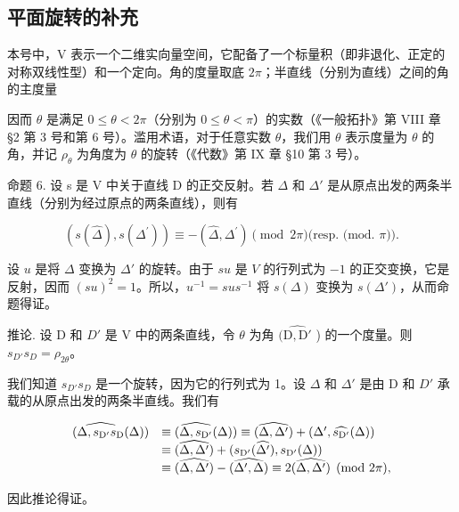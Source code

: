 \subsection{平面旋转的补充}

本号中，V 表示一个二维实向量空间，它配备了一个标量积（即非退化、正定的对称双线性型）和一个定向。角的度量取底 \(2\pi\)；半直线（分别为直线）之间的角的主度量

因而 \(\theta\) 是满足 \(0 \leqslant \theta < 2\pi\)（分别为 \(0 \leqslant \theta < \pi\)）的实数（《一般拓扑》第 VIII 章 §2 第 3 号和第 6 号）。滥用术语，对于任意实数 \(\theta\)，我们用 \(\theta\) 表示度量为 \(\theta\) 的角，并记 \(\rho_{\theta}\) 为角度为 \(\theta\) 的旋转（《代数》第 IX 章 §10 第 3 号）。

命题 6. 设 s 是 V 中关于直线 D 的正交反射。若 \(\Delta\) 和 \(\Delta'\) 是从原点出发的两条半直线（分别为经过原点的两条直线），则有

\[
(s (\widehat {\Delta}), s (\Delta^ {\prime})) \equiv - (\widehat {\Delta}, \Delta^ {\prime}) \pmod {2 \pi} \text {(resp. (mod. } \pi \text {))}.
\]

设 \(u\) 是将 \(\Delta\) 变换为 \(\Delta'\) 的旋转。由于 \(su\) 是 \(V\) 的行列式为 \(-1\) 的正交变换，它是反射，因而 \((su)^2 = 1\)。所以，\(u^{-1} = sus^{-1}\) 将 \(s(\Delta)\) 变换为 \(s(\Delta')\)，从而命题得证。

推论. 设 D 和 \(D'\) 是 V 中的两条直线，令 \(\theta\) 为角 \((\widehat{\mathrm{D},\mathrm{D}'}\) ) 的一个度量。则 \(s_{D'}s_{D} = \rho_{2\theta}\)。

我们知道 \(s_{D'} s_{D}\) 是一个旋转，因为它的行列式为 1。设 \(\Delta\) 和 \(\Delta'\) 是由 D 和 \(D'\) 承载的从原点出发的两条半直线。我们有

\[
\begin{array}{r l} (\widehat {\Delta , s _ {\mathrm {D^ {\prime}}} s _ {\mathrm{D}}} (\Delta)) & \equiv (\widehat {\Delta , s _ {\mathrm {D^ {\prime}}}} (\Delta)) \equiv (\widehat {\Delta , \Delta^ {\prime}}) + (\Delta^ {\prime}, \widehat {s _ {\mathrm {D^ {\prime}}}} (\Delta)) \\ & \equiv (\widehat {\Delta , \Delta^ {\prime}}) + (s _ {\mathrm {D^ {\prime}}} (\widehat {\Delta^ {\prime}}), s _ {\mathrm {D^ {\prime}}} (\Delta)) \\ & \equiv (\widehat {\Delta , \Delta^ {\prime}}) - (\widehat {\Delta^ {\prime} , \Delta}) \equiv 2 (\widehat {\Delta , \Delta^ {\prime}}) \pmod {2 \pi}, \end{array}
\]

因此推论得证。

